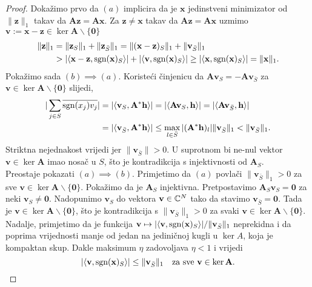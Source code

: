 \documentclass[a4paper,twoside,12pt]{memoir} %
\newcommand{\vect}[1]{\mathbf{#1}}
\renewcommand{\vec}{\vect}
\newcommand{\norm}[1]{\|{#1}\|}
\newcommand{\sgn}{\text{\normalfont{sgn}}}
\begin{document}
\begin{proof}
    Doka\v{z}imo prvo da $(a)$ implicira da je $\vec x$ jedinstveni minimizator od $\norm{\vec z}_1$ takav da $\vec{Az} = \vec{Ax}$. Za $\vec z \neq \vec x$ takav da $\vec{Az} = \vec {Ax}$ uzmimo $\vec v := \vec x - \vec z \in \ker \vec A \backslash \{\vec 0\}$
    \begin{align*}
        \norm{\vec z}_1 &= \norm{\vec z_S}_1 + \norm{\vec z_{\bar S} }_1 = \norm{(\vec x - \vec z)_S}_1 + \norm{\vec v_{\bar S}}_1  \\
        &> |\langle \vec x - \vec z, \sgn(\vec x)_S \rangle | + |\langle \vec v, \sgn(\vec x)_S \rangle| \geq |\langle \vec x, \sgn(\vec x)_S  \rangle| = \norm{\vec x}_1.
    \end{align*}
    \indent Poka\v{z}imo sada $(b) \implies (a)$. Koriste\'ci \v{c}injenicu da $\vec{Av}_S = - \vec {Av}_{\bar S}$ za $\vec v \in \ker \vec A \backslash \{\vec 0\}$ slijedi,
    \begin{align*}
        |\sum_{j \in S} \overline{\sgn(x_j)v_j}| &= |\langle \vec v_S, \vec A^* \vec h \rangle|  = |\langle \vec{Av}_S, \vec h \rangle| = |\langle \vec{Av}_{\bar S}, \vec h\rangle| \\ 
        &= |\langle \vec v_{\bar S}, \vec{A}^*\vec h \rangle| \leq \max_{l \in \bar S} |(\vec A^* \vec h)_l| \norm{\vec v_{\bar S}}_1 < \norm{\vec v_{\bar S}}_1.
    \end{align*}
    Striktna nejednakost vrijedi jer $\norm{\vec v_{\bar S}} > 0$. U suprotnom bi ne-nul vektor $\vec v \in \ker \vec A$ imao nosa\v{c} u $S$, \v{s}to je kontradikcija s injektivnosti od $\vec A_S$.\\
    \indent Preostaje pokazati $(a) \implies (b)$. Primjetimo da $(a)$ povla\v{c}i $\norm{\vec v_{\bar S}}_1 > 0$ za sve $\vec v \in \ker \vec A \backslash \{\vec 0\}$. Poka\v{z}imo da je $\vec A_S$ injektivna. Pretpostavimo $\vec A_S \vec v_S = \vec 0$ za neki $\vec v_S \neq \vec 0$. Nadopunimo $\vec v_S$ do vektora $\vec v \in \C^N$ tako da stavimo $\vec v_{\bar S} = \vec 0$. Tada je $\vec v \in \ker \vec A \backslash \{\vec 0\}$, \v{s}to je kontradikcija s $\norm{\vec v_{\bar S}}_1 > 0$ za svaki $\vec v \in \ker \vec A \backslash \{\vec 0\}$. Nadalje, primjetimo da je funkcija $\vec v \mapsto |\langle \vec v, \sgn(\vec x)_S \rangle|/ \norm{\vec v_{\bar S}}_1$ neprekidna i da poprima vrijednosti manje od jedan na jedini\v{c}noj kugli u $\ker A$, koja je kompaktan skup. Dakle maksimum $\eta$ zadovoljava $\eta < 1$ i vrijedi 
    \begin{equation*}
        |\langle \vec v, \sgn(\vec x)_S \rangle|  \leq \norm{\vec v_{\bar S}}_1 \quad \text{za sve } \vec v \in \ker \vec A.

\end{equation*}
\end{proof}
\end{document}
